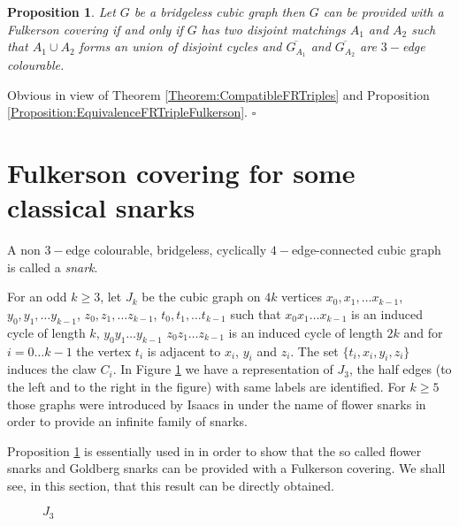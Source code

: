 \documentclass{amsart}
\newtheorem{prop}[thm]{Proposition}
\theoremstyle{definition}
\theoremstyle{remark}
\newenvironment{prf}{{\bf \noindent Proof } }{\hfill$\square$\\}
\begin{document}
\begin{prop}\cite{HaoNiuWanZhaZha2009}\label{Proposition:HaoNiuWanZhanZhan}
Let $G$ be a bridgeless cubic graph then $G$ can be provided with a
Fulkerson covering if and only if $G$ has  two disjoint matchings
$A_{1}$ and $A_{2}$ such that $A_{1} \cup A_{2}$ forms an union of disjoint cycles and $\overline{G_{A_{1}}}$ and
$\overline{G_{A_{2}}}$ are $3-$edge colourable.
\end{prop}
\begin{prf}
Obvious in view of Theorem \ref{Theorem:CompatibleFRTriples} and
Proposition \ref{Proposition:EquivalenceFRTripleFulkerson}.
\end{prf}

\section{Fulkerson covering for some classical snarks}
A non $3-$edge colourable, bridgeless, cyclically $4-$edge-connected
cubic graph is called a {\em snark}. 

For an odd $k\geq 3$, let $J_k$ be the cubic graph on $4k$ vertices $x_0,x_1,\ldots
x_{k-1}$, $y_0,y_1,\ldots y_{k-1}$, $z_0,z_1,\ldots z_{k-1}$,
$t_0,t_1,\ldots t_{k-1}$ such that $x_0x_1\ldots x_{k-1}$ is an
induced cycle of length $k$, $y_0y_1\ldots y_{k-1}$ $z_0z_1\ldots
z_{k-1}$ is an induced cycle of length $2k$ and for $i=0\ldots k-1$
the vertex $t_i$ is adjacent to $x_i$, $y_i$ and $z_i$. The set
$\{t_i,x_i,y_i,z_i\}$ induces the claw $C_i$. In Figure
\ref{Figure:J3} we have a representation of $J_{3}$, the half edges
(to the left and to the right in the figure) with same labels are
identified.
For $k\geq 5$ those graphs were introduced by Isaacs in \cite{Isa75} under the name of flower snarks in order to provide an infinite family of snarks.

Proposition \ref{Proposition:HaoNiuWanZhanZhan} is essentially used in
\cite{HaoNiuWanZhaZha2009} in order to show that the so called
flower snarks and Goldberg snarks can be provided with a Fulkerson
covering. We shall see, in this section, that this result can be
directly obtained.
\begin{figure}
\centering {} \hsize \noindent {}
\caption{$J_{3}$} \label{Figure:J3}
\end{figure}
\end{document}
